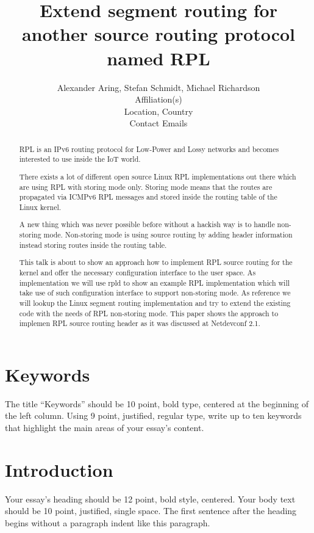 \documentclass[letterpaper]{article}
\title{Extend segment routing for another source routing protocol named RPL}
\author{Alexander Aring, Stefan Schmidt, Michael Richardson\\
Affiliation(s)\\
Location, Country\\
Contact Emails\\
\newline
\newline
}
\begin{document}
 
\maketitle
\begin{abstract}
RPL \cite{rfc6550} is an IPv6 routing protocol for Low-Power and Lossy networks and becomes interested to use inside the IoT world.

There exists a lot of different open source Linux RPL implementations out there which are using RPL with storing mode only.
Storing mode means that the routes are propagated via ICMPv6 RPL messages and stored inside the routing table of the Linux kernel.

A new thing which was never possible before without a hackish way is to handle non-storing mode.
Non-storing mode is using source routing by adding header information \cite{rfc6554} instead storing routes inside the routing table.

This talk is about to show an approach how to implement RPL source routing for the kernel and offer the necessary configuration interface to the user space.
As implementation we will use rpld \cite{rpld} to show an example RPL implementation which will take use of such configuration interface to support non-storing mode.
As reference we will lookup the Linux segment routing implementation and try to extend the existing code with the needs of RPL non-storing mode.
This paper shows the approach to implemen RPL source routing header as it was discussed at Netdevconf 2.1.
\end{abstract}

\section{Keywords}

The title ``Keywords'' should be 10 point, bold type, centered at the beginning of the left column. Using 9 point, justified, regular type, write up to ten keywords that highlight the main areas of your essay’s content. 

\section{Introduction}

Your essay’s heading should be 12 point, bold style, centered. Your body text should be 10 point, justified, single space. The first sentence after the heading begins without a paragraph indent like this paragraph.
\end{document}
